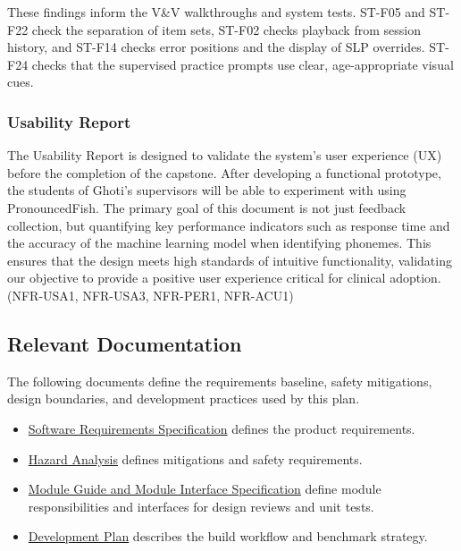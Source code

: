 \documentclass[12pt, titlepage]{article}
\begin{document}
These findings inform the V\&V walkthroughs and system tests. ST-F05 and
ST-F22 check the separation of item sets, ST-F02 checks playback from
session history, and ST-F14 checks error positions and the display of SLP
overrides. ST-F24 checks that the supervised practice prompts use clear,
age-appropriate visual cues.

\subsubsection{Usability Report}

The Usability Report is designed to validate the system's user experience (UX) before the completion of the capstone. After developing a functional prototype, the students of Ghoti's supervisors will be able to experiment with using PronouncedFish. The primary goal of this document is not just feedback collection, but quantifying key performance indicators such as response time and the accuracy of the machine learning model when identifying phonemes. This ensures that the design meets high standards of intuitive functionality, validating our objective to provide a positive user experience critical for clinical adoption. (NFR-USA1, NFR-USA3, NFR-PER1, NFR-ACU1)

\subsection{Relevant Documentation}

The following documents define the requirements baseline, safety mitigations, design boundaries,
and development practices used by this plan.

\begin{itemize}
    \item \href{https://github.com/lilyporter/Ghoti/blob/main/pdfs/SRS/SRS.pdf}{Software Requirements Specification} defines the product requirements.
    \item \href{https://github.com/lilyporter/Ghoti/blob/main/pdfs/HazardAnalysis/HazardAnalysis.pdf}{Hazard Analysis} defines mitigations and safety requirements.
    \item \href{https://github.com/lilyporter/Ghoti/blob/main/pdfs/Design/design.pdf}{Module Guide and Module Interface Specification} define module responsibilities and interfaces for design reviews and unit tests.
    \item \href{https://github.com/lilyporter/Ghoti/blob/main/pdfs/DevelopmentPlan/DevelopmentPlan.pdf}{Development Plan} describes the build workflow and benchmark strategy.
\end{itemize}
\end{document}
